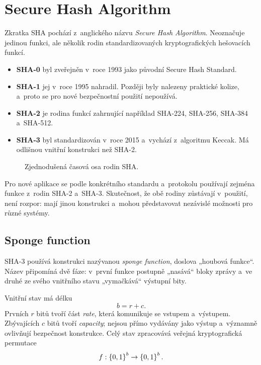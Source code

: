 \section{Secure Hash Algorithm}\label{sec:krypto-sha}

Zkratka SHA pochází z~anglického názvu \emph{Secure Hash Algorithm}. Neoznačuje jedinou funkci, ale několik rodin standardizovaných kryptografických hešovacích funkcí.

\begin{itemize}
    \item \textbf{SHA-0} byl zveřejněn v~roce 1993 jako původní Secure Hash Standard.
    \item \textbf{SHA-1} jej v~roce 1995 nahradil. Později byly nalezeny praktické kolize, a~proto se pro nové bezpečnostní použití nepoužívá.
    \item \textbf{SHA-2} je rodina funkcí zahrnující například SHA-224, SHA-256, SHA-384 a~SHA-512.
    \item \textbf{SHA-3} byl standardizován v~roce 2015 a~vychází z~algoritmu Keccak. Má odlišnou vnitřní konstrukci než SHA-2.
\end{itemize}

\begin{figure}[ht]
    \centering
    
    \caption{Zjednodušená časová osa rodin SHA.}
    \label{fig:krypto-sha-casova-osa}
\end{figure}

Pro nové aplikace se podle konkrétního standardu a~protokolu používají zejména funkce z~rodin SHA-2 a~SHA-3. Skutečnost, že obě rodiny zůstávají v~použití, není rozpor: mají jinou konstrukci a~mohou představovat nezávislé možnosti pro různé systémy.

\subsection{Sponge function}

SHA-3 používá konstrukci nazývanou \emph{sponge function}, doslova „houbová funkce“. Název připomíná dvě fáze: v~první funkce postupně „nasává“ bloky zprávy a~ve druhé ze svého vnitřního stavu „vymačkává“ výstupní bity.

Vnitřní stav má délku
\[
    b=r+c.
\]
Prvních $r$ bitů tvoří část \emph{rate}, která komunikuje se vstupem a~výstupem. Zbývajících $c$ bitů tvoří \emph{capacity}; nejsou přímo vydávány jako výstup a~významně ovlivňují bezpečnost konstrukce. Celý stav zpracovává veřejná kryptografická permutace
\[
    f:\left\{0,1\right\}^{b} \rightarrow \left\{0,1\right\}^{b}.
\]

